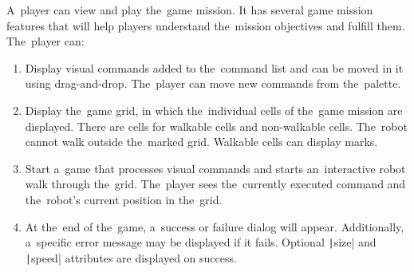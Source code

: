 \begin{enumerate}[label=\textbf{F\arabic*}, ref=F\arabic*]
    \pagebreak
     A~player can view and play the~game mission.
    It has several game mission features that will help players understand the~mission objectives and fulfill them.
    The~player can:
    \begin{enumerate}
        \item Display visual commands added to the~command list and can be moved in it using drag-and-drop.
        The~player can move new commands from the~palette.
        \item Display the~game grid, in which the~individual cells of the~game mission are displayed.
        There are cells for walkable cells and non-walkable cells.
        The~robot cannot walk outside the~marked grid.
        Walkable cells can display marks.
        \item Start a~game that processes visual commands and starts an~interactive robot walk through the~grid.
        The~player sees the~currently executed command and the~robot's current position in the~grid.
        \item At the~end of the~game, a~success or failure dialog will appear.
        Additionally, a~specific error message may be displayed if it fails.
        Optional \texttt|size| and \texttt|speed| attributes are displayed on success.
    \end{enumerate}
\end{enumerate}
